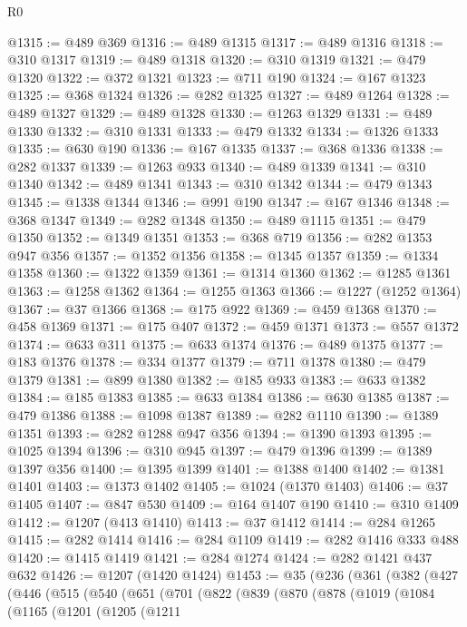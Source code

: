\begin{lexlean}{R0}
\begin{coremodule}
@1315 := @489 @369
@1316 := @489 @1315
@1317 := @489 @1316
@1318 := @310 @1317
@1319 := @489 @1318
@1320 := @310 @1319
@1321 := @479 @1320
@1322 := @372 @1321
@1323 := @711 @190
@1324 := @167 @1323
@1325 := @368 @1324
@1326 := @282 @1325
@1327 := @489 @1264
@1328 := @489 @1327
@1329 := @489 @1328
@1330 := @1263 @1329
@1331 := @489 @1330
@1332 := @310 @1331
@1333 := @479 @1332
@1334 := @1326 @1333
@1335 := @630 @190
@1336 := @167 @1335
@1337 := @368 @1336
@1338 := @282 @1337
@1339 := @1263 @933
@1340 := @489 @1339
@1341 := @310 @1340
@1342 := @489 @1341
@1343 := @310 @1342
@1344 := @479 @1343
@1345 := @1338 @1344
@1346 := @991 @190
@1347 := @167 @1346
@1348 := @368 @1347
@1349 := @282 @1348
@1350 := @489 @1115
@1351 := @479 @1350
@1352 := @1349 @1351
@1353 := @368 @719
@1356 := @282 @1353 @947 @356
@1357 := @1352 @1356
@1358 := @1345 @1357
@1359 := @1334 @1358
@1360 := @1322 @1359
@1361 := @1314 @1360
@1362 := @1285 @1361
@1363 := @1258 @1362
@1364 := @1255 @1363
@1366 := @1227 (@1252 @1364)
@1367 := @37 @1366
@1368 := @175 @922
@1369 := @459 @1368
@1370 := @458 @1369
@1371 := @175 @407
@1372 := @459 @1371
@1373 := @557 @1372
@1374 := @633 @311
@1375 := @633 @1374
@1376 := @489 @1375
@1377 := @183 @1376
@1378 := @334 @1377
@1379 := @711 @1378
@1380 := @479 @1379
@1381 := @899 @1380
@1382 := @185 @933
@1383 := @633 @1382
@1384 := @185 @1383
@1385 := @633 @1384
@1386 := @630 @1385
@1387 := @479 @1386
@1388 := @1098 @1387
@1389 := @282 @1110
@1390 := @1389 @1351
@1393 := @282 @1288 @947 @356
@1394 := @1390 @1393
@1395 := @1025 @1394
@1396 := @310 @945
@1397 := @479 @1396
@1399 := @1389 @1397 @356
@1400 := @1395 @1399
@1401 := @1388 @1400
@1402 := @1381 @1401
@1403 := @1373 @1402
@1405 := @1024 (@1370 @1403)
@1406 := @37 @1405
@1407 := @847 @530
@1409 := @164 @1407 @190
@1410 := @310 @1409
@1412 := @1207 (@413 @1410)
@1413 := @37 @1412
@1414 := @284 @1265
@1415 := @282 @1414
@1416 := @284 @1109
@1419 := @282 @1416 @333 @488
@1420 := @1415 @1419
@1421 := @284 @1274
@1424 := @282 @1421 @437 @632
@1426 := @1207 (@1420 @1424)
@1453 := @35
    (@236
      (@361
        (@382
          (@427
            (@446
              (@515
                (@540
                  (@651
                    (@701
                      (@822
                        (@839
                          (@870
                            (@878
                              (@1019
                                (@1084
                                  (@1165
                                    (@1201
                                      (@1205
                                        (@1211

\end{coremodule}
\end{lexlean}
